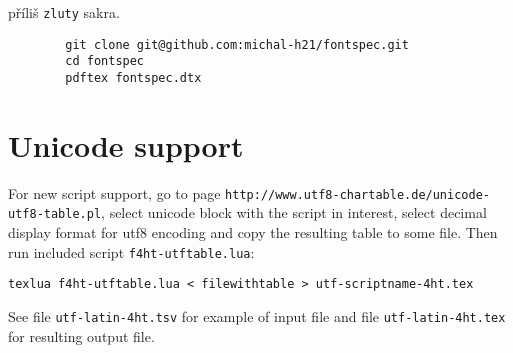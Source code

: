 \documentclass{article}
\begin{document}
	příliš \verb|zluty| sakra.

	\begin{verbatim}
		git clone git@github.com:michal-h21/fontspec.git
		cd fontspec
		pdftex fontspec.dtx
	\end{verbatim} 
	
	\section{Unicode support}

	For new script support, go to page 
	\verb|http://www.utf8-chartable.de/unicode-utf8-table.pl|, 
	select unicode block with the script in interest, 
	select decimal display format for utf8 encoding and copy 
	the resulting table to some file. 
	Then run included script \verb|f4ht-utftable.lua|:

\begin{verbatim}
texlua f4ht-utftable.lua < filewithtable > utf-scriptname-4ht.tex
\end{verbatim} 

See file \verb|utf-latin-4ht.tsv| for example of input file and 
file \verb|utf-latin-4ht.tex| for resulting output file.
\end{document}
